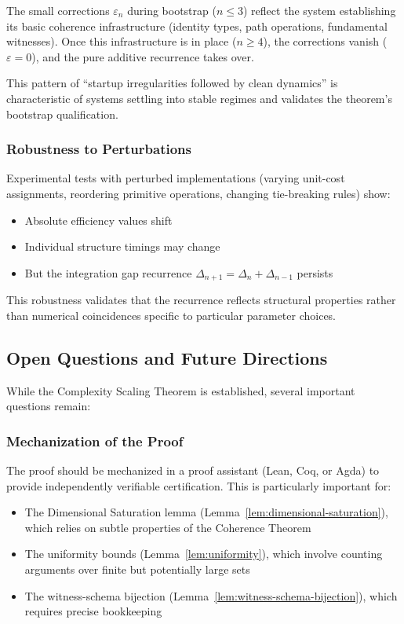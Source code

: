 \documentclass[11pt]{article}
\theoremstyle{definition}
\theoremstyle{remark}
\begin{document}
The small corrections $\varepsilon_n$ during bootstrap ($n \leq 3$) reflect the system establishing its basic
coherence infrastructure (identity types, path operations, fundamental witnesses). Once this
infrastructure is in place ($n \geq 4$), the corrections vanish ($\varepsilon = 0$), and the pure additive
recurrence takes over.

This pattern of ``startup irregularities followed by clean dynamics'' is characteristic of systems
settling into stable regimes and validates the theorem's bootstrap qualification.

\subsubsection{Robustness to Perturbations}

Experimental tests with perturbed implementations (varying unit-cost assignments, reordering
primitive operations, changing tie-breaking rules) show:
\begin{itemize}
\item Absolute efficiency values shift
\item Individual structure timings may change
\item But the integration gap recurrence $\Delta_{n+1} = \Delta_n + \Delta_{n-1}$ persists
\end{itemize}

This robustness validates that the recurrence reflects structural properties rather than numerical
coincidences specific to particular parameter choices.

\subsection{Open Questions and Future Directions}

While the Complexity Scaling Theorem is established, several important questions remain:

\subsubsection{Mechanization of the Proof}

The proof should be mechanized in a proof assistant (Lean, Coq, or Agda) to provide independently
verifiable certification. This is particularly important for:
\begin{itemize}
\item The Dimensional Saturation lemma (Lemma~\ref{lem:dimensional-saturation}), which relies on
subtle properties of the Coherence Theorem
\item The uniformity bounds (Lemma~\ref{lem:uniformity}), which involve counting arguments over
finite but potentially large sets
\item The witness-schema bijection (Lemma~\ref{lem:witness-schema-bijection}), which requires
precise bookkeeping
\end{itemize}
\end{document}

